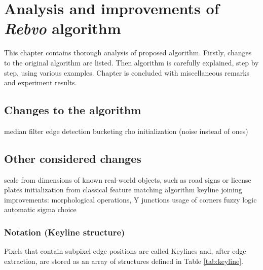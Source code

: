 \chapter{Analysis and improvements of \textit{Rebvo} algorithm}
\label{cha:intro2}

This chapter contains thorough analysis of proposed algorithm. Firstly, changes to the original algorithm are listed. Then algorithm is carefully explained, step by step, using various examples. Chapter is concluded with miscellaneous remarks and experiment results.

\section{Changes to the algorithm}
\label{sec:changes}

median filter
edge detection bucketing
rho initialization (noise instead of ones)


\section{Other considered changes}
\label{sec:rejected}

scale from dimensions of known real-world objects, such as road signs or license plates
initialization from classical feature matching algorithm
keyline joining improvements: morphological operations, Y junctions
usage of corners
fuzzy logic
automatic sigma choice


\subsection{Notation (Keyline structure)}

Pixels that contain subpixel edge positions are called Keylines and, after edge extraction, are stored as an array of structures defined in Table \ref{tab:keyline}.


